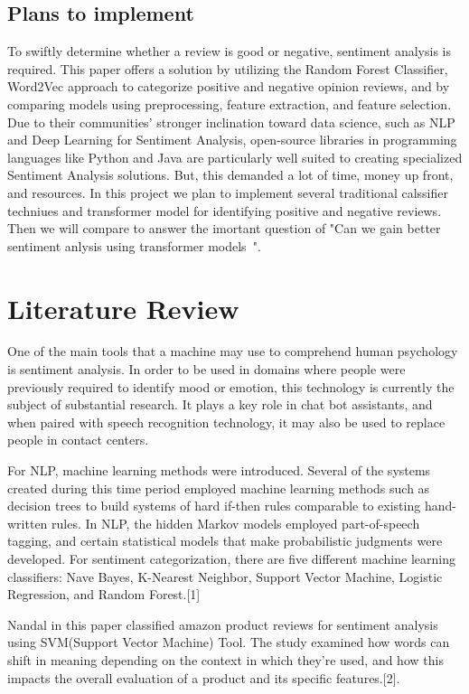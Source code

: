 \subsection{Plans to implement}
To swiftly determine whether a review is good or negative, sentiment analysis is required. 
This paper offers a solution by utilizing the Random Forest Classifier, Word2Vec approach to categorize 
positive and negative opinion reviews, and by comparing models using preprocessing, feature extraction, and feature selection. 
Due to their communities' stronger inclination toward data science, such as NLP and Deep Learning for Sentiment Analysis, 
open-source libraries in programming languages like Python and Java are particularly well suited to creating specialized Sentiment 
Analysis solutions. But, this demanded a lot of time, money up front, and resources.
In this project we plan to implement several traditional calssifier techniues and transformer model for identifying positive and negative reviews. 
Then we will compare to answer the imortant question of "Can we gain better sentiment anlysis using transformer models~\cite{vaswani2017attention}". 

\section{Literature Review}
One of the main tools that a machine may use to comprehend human psychology is sentiment analysis. In order to be used in domains where people were previously required to identify mood or emotion, this technology is currently the subject of substantial research. It plays a key role in chat bot assistants, and when paired with speech recognition technology, it may also be used to replace people in contact centers. 

\par For NLP, machine learning methods were introduced. Several of the systems created during this time period employed machine learning methods such as decision trees to build systems of hard if-then rules comparable to existing hand-written rules. In NLP, the hidden Markov models employed part-of-speech tagging, and certain statistical models that make probabilistic judgments were developed. For sentiment categorization, there are five different machine learning classifiers: Nave Bayes, K-Nearest Neighbor, Support Vector Machine, Logistic Regression, and Random Forest.[1]

Nandal in this paper classified amazon product reviews for sentiment analysis using SVM(Support Vector Machine) Tool. The study examined how words can shift in meaning depending on the context in which they're used, and how this impacts the overall evaluation of a product and its specific features.[2].

